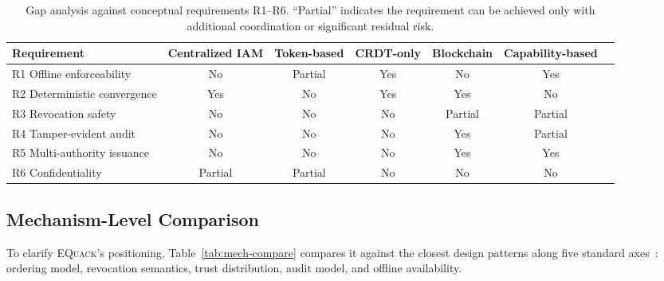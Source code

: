 \documentclass[10pt,journal,compsoc]{IEEEtran}
\newcommand{\equack}{\textsc{EQuack}}
\begin{document}
\begin{table}[htbp]
\centering
\caption{Gap analysis against conceptual requirements R1--R6. ``Partial'' indicates the requirement can be achieved only with additional coordination or significant residual risk.}
\label{tab:gap-summary-paperC}
\footnotesize
\setlength{\tabcolsep}{4pt}
\renewcommand{\arraystretch}{1.25}
\begin{tabular}{p{3.8cm} cccccc}
\toprule
\textbf{Requirement} & \textbf{Centralized IAM} & \textbf{Token-based} & \textbf{CRDT-only} & \textbf{Blockchain} & \textbf{Capability-based} \\
\midrule
R1 Offline enforceability        & No      & Partial & Yes     & No       & Yes     \\
R2 Deterministic convergence     & Yes     & No      & Yes     & Yes      & No      \\
R3 Revocation safety             & No      & No      & No      & Partial  & Partial \\
R4 Tamper-evident audit          & No      & No      & No      & Yes      & Partial \\
R5 Multi-authority issuance      & No      & No      & No      & Yes      & Yes     \\
R6 Confidentiality               & Partial & Partial & No      & No       & No      \\
\bottomrule
\end{tabular}
\end{table}

\subsection{Mechanism-Level Comparison}\label{sec:mech-compare}

To clarify \equack{}'s positioning, Table~\ref{tab:mech-compare} compares it against the closest design patterns along five standard axes~\cite{bamakan2020criteria,fan2020perf_eval,touloupou2022benchmark,xiao2020consensus_survey,wang2019consensus_survey,ferdous2021_consensus_survey,nguyen2019_pos,li2021_multilayer_pbft}: ordering model, revocation semantics, trust distribution, audit model, and offline availability.
\end{document}
